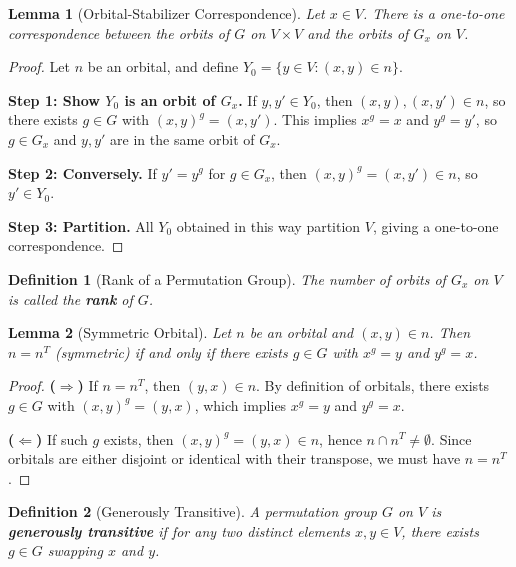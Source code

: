 \documentclass[12pt,a4paper,openany]{book}
\newtheorem{definition}{Definition}[section]
\newtheorem{lemma}{Lemma}[section]
\begin{document}
\begin{lemma}[Orbital-Stabilizer Correspondence]\label{lem:orbital-correspondence}
Let $x \in V$. There is a one-to-one correspondence between the orbits of $G$ on $V \times V$ and the orbits of $G_x$ on $V$.
\end{lemma}

\begin{proof}
Let $n$ be an orbital, and define $Y_0 = \{y \in V : (x,y) \in n\}$.  

\textbf{Step 1: Show $Y_0$ is an orbit of $G_x$.}  
If $y, y' \in Y_0$, then $(x,y), (x,y') \in n$, so there exists $g \in G$ with $(x,y)^g = (x,y')$. This implies $x^g = x$ and $y^g = y'$, so $g \in G_x$ and $y,y'$ are in the same orbit of $G_x$.

\textbf{Step 2: Conversely.}  
If $y' = y^g$ for $g \in G_x$, then $(x,y)^g = (x,y') \in n$, so $y' \in Y_0$.

\textbf{Step 3: Partition.}  
All $Y_0$ obtained in this way partition $V$, giving a one-to-one correspondence.
\end{proof}

\begin{definition}[Rank of a Permutation Group]
The number of orbits of $G_x$ on $V$ is called the \textbf{rank} of $G$.
\end{definition}

\begin{lemma}[Symmetric Orbital]\label{lem:symmetric-orbital}
Let $n$ be an orbital and $(x,y) \in n$. Then $n = n^T$ (symmetric) if and only if there exists $g \in G$ with $x^g = y$ and $y^g = x$.
\end{lemma}

\begin{proof}
\textbf{($\Rightarrow$)} If $n = n^T$, then $(y,x) \in n$. By definition of orbitals, there exists $g \in G$ with $(x,y)^g = (y,x)$, which implies $x^g = y$ and $y^g = x$.

\textbf{($\Leftarrow$)} If such $g$ exists, then $(x,y)^g = (y,x) \in n$, hence $n \cap n^T \neq \emptyset$. Since orbitals are either disjoint or identical with their transpose, we must have $n = n^T$.
\end{proof}

\begin{definition}[Generously Transitive]
A permutation group $G$ on $V$ is \textbf{generously transitive} if for any two distinct elements $x, y \in V$, there exists $g \in G$ swapping $x$ and $y$.
\end{definition}
\end{document}
